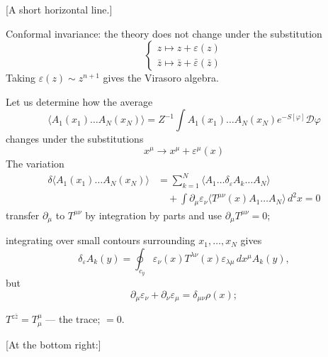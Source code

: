 [A short horizontal line.]

Conformal invariance: the theory does not change under the substitution
\begin{equation*}
\begin{cases}
z\mapsto z+\varepsilon(z)\\
\bar z\mapsto\bar z+\bar\varepsilon(\bar z)
\end{cases}
\tag{22}
\end{equation*}
Taking $\varepsilon(z)\sim z^{n+1}$ gives the Virasoro algebra.

Let us determine how the average
\begin{equation*}
\langle A_1(x_1)\ldots A_N(x_N)\rangle
=Z^{-1}\int A_1(x_1)\ldots A_N(x_N)e^{-S[\varphi]}\mathcal D\varphi
\tag{23}
\end{equation*}
changes under the substitutions
\begin{equation*}
x^\mu\to x^\mu+\varepsilon^\mu(x)
\tag{24}
\end{equation*}
The variation
\begin{equation*}
\begin{aligned}
\delta\langle A_1(x_1)\ldots A_N(x_N)\rangle
&=\sum_{k=1}^{N}\langle A_1\ldots\delta_\varepsilon A_k\ldots A_N\rangle\\
&\quad+\int\partial_\mu\varepsilon_\nu
\langle T^{\mu\nu}(x)A_1\ldots A_N\rangle\,d^2x=0
\end{aligned}
\tag{25}
\end{equation*}
transfer $\partial_\mu$ to $T^{\mu\nu}$ by integration by parts and use $\partial_\mu T^{\mu\nu}=0$;

integrating over small contours surrounding $x_1,\ldots,x_N$ gives
\begin{equation*}
\delta_\varepsilon A_k(y)=\oint_{c_y}\varepsilon_\nu(x)T^{\lambda\nu}(x)
\varepsilon_{\lambda\mu}\,dx^\mu A_k(y),
\end{equation*}
but
\begin{equation*}
\partial_\mu\varepsilon_\nu+\partial_\nu\varepsilon_\mu=\delta_{\mu\nu}\rho(x);
\end{equation*}

$T^{z\bar z}=T^\mu_\mu$ --- the trace; $=0$.

[At the bottom right:]
\begin{center}
\end{center}

